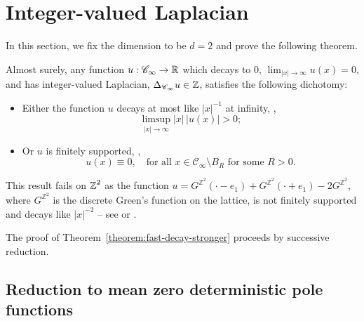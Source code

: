 \documentclass[12pt]{amsart}
\numberwithin{equation}{section}
\begin{document}
	
	
	
	\section{Integer-valued Laplacian} \label{sec:toppling-invariants}
	In this section, we fix the dimension to be $d = 2$ and prove the following theorem. 
	\begin{theorem} \label{theorem:fast-decay-stronger}
		Almost surely, any function $u: \mathscr{C}_{\infty} \to \operatorname{\mathbb{R}}$ which decays to 0,  $\lim_{|x| \to \infty} u(x) = 0$,
		and has integer-valued Laplacian,  $\Delta_{\mathscr{C}_{\infty}} u \in \operatorname{\mathbb{Z}}$, satisfies the following dichotomy:
		\begin{itemize}
			\item Either the function $u$ decays at most like $|x|^{-1}$ at infinity, \ie,
			\begin{equation} \label{eq:linear-decay}
				\limsup_{|x| \to \infty} |x| \, |u(x)| > 0;
			\end{equation}
			\item Or $u$ is finitely supported, \ie, 
			\begin{equation} \label{eq:compactly-supported}
				u(x) \equiv 0, \quad \mbox{for all $x \in \mathscr{C}_{\infty} \setminus B_R$ for some $R > 0$}. 
			\end{equation}
		\end{itemize}
	\end{theorem}
	
	\begin{remark}
		This result fails on $\operatorname{\mathbb{Z}}^2$ as the function $u = G^{\mathbb{Z}^2}(\cdot - e_1) + G^{\mathbb{Z}^2}(\cdot + e_1) - 2 G^{\mathbb{Z}^2}$, where $G^{\mathbb{Z}^2}$ is the discrete Green's function on the lattice, is not finitely supported and decays like $|x|^{-2}$ -- see \cite{sandpiles-square-lattice} or \cite{schmidt-verbitskiy-2009}.
	\end{remark}
	
	
	The proof of Theorem~\ref{theorem:fast-decay-stronger} proceeds by successive reduction.
	
	\subsection{Reduction to mean zero deterministic pole functions}
	
\end{document}
